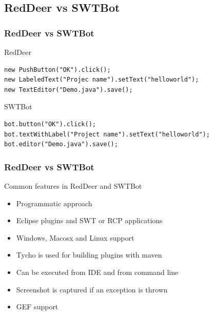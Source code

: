 \documentclass{beamer}
\begin{document}
%
%
%
%

\subsection{RedDeer vs SWTBot}
\begin{frame}[fragile]
\frametitle{RedDeer vs SWTBot}
RedDeer  
\begin{lstlisting}
new PushButton("OK").click();
new LabeledText("Projec name").setText("helloworld");
new TextEditor("Demo.java").save();
\end{lstlisting}
\vspace{0.5cm}
SWTBot
\begin{lstlisting}
bot.button("OK").click();
bot.textWithLabel("Project name").setText("helloworld");
bot.editor("Demo.java").save();
\end{lstlisting}
\end{frame}

\begin{frame}[fragile]
\frametitle{RedDeer vs SWTBot}
Common features in RedDeer and SWTBot
\begin{itemize}
\item Programmatic approach
\item Eclipse plugins and SWT or RCP applications
\item Windows, Macosx and Linux support
\item Tycho is used for building plugins with maven
\item Can be executed from IDE and from command line
\item Screenshot is captured if an exception is thrown
\item GEF support
\end{itemize}
\end{frame}
\end{document}

